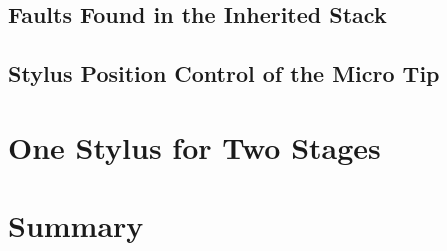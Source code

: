 \subsection{Faults Found in the Inherited Stack}
\label{sec:mod-micro-faults}

\subsection{Stylus Position Control of the Micro Tip}
\label{sec:mod-micro-position}

\section{One Stylus for Two Stages}
\label{sec:mod-mode-switch}

\section{Summary}
\label{sec:mod-summary}
